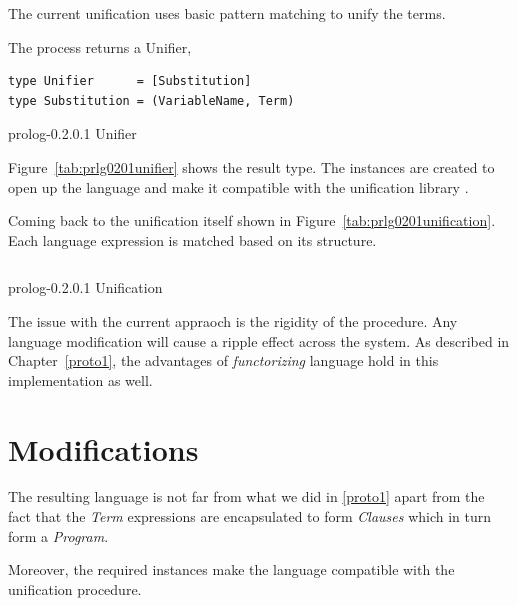 \documentclass[thesis-solanki.tex]{subfiles}
\begin{document}
\clearpage

The current unification uses basic pattern matching to unify the terms. 

The process returns a Unifier,
\begin{code-list}[h]
\begin{verbatim}
type Unifier      = [Substitution]
type Substitution = (VariableName, Term)
\end{verbatim}
\caption{prolog-0.2.0.1 Unifier}
\label{tab:prlg0201unifier}
\end{code-list}



Figure~\ref{tab:prlg0201unifier} shows the result type. The instances are created to open up the language and make it compatible with the
unification library \cite{prolog-lib}.

\clearpage

Coming back to the unification itself shown in Figure~\ref{tab:prlg0201unification}. Each language expression is matched based on its 
structure.
  
\begin{code-list}[h]
  \begin{singlespace}
    \inputminted[linenos]{haskell}{haskell-proto2-unification-lion.hs}
  \end{singlespace}
\caption{prolog-0.2.0.1 Unification}
\label{tab:prlg0201unification}
\end{code-list}

The issue with the current appraoch is the rigidity of the procedure. Any language modification will cause a ripple effect across the 
system. As described in Chapter~\ref{proto1}, the advantages of \textit{functorizing} language hold in this implementation as well.

\clearpage
\section{Modifications}
The resulting language is not far from what we did in \ref{proto1} apart from the fact that the \textit{Term} expressions are encapsulated
to form \textit{Clauses} which in turn form a \textit{Program}.

Moreover, the required instances make the language compatible with the unification procedure.

\begin{singlespace}
  \inputminted[linenos]{haskell}{haskell-proto2-starry-forked.hs}
\end{singlespace}
\end{document}
